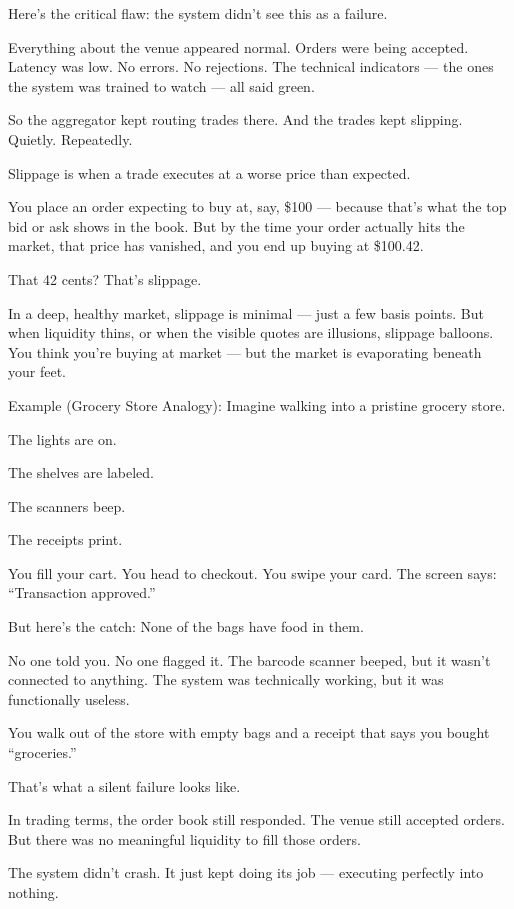 Here’s the critical flaw: the system didn’t see this as a failure.

Everything about the venue appeared normal. Orders were being accepted. Latency was low. No errors. 
No rejections. The technical indicators — the ones the system was trained to watch — all said green.

So the aggregator kept routing trades there. And the trades kept slipping. Quietly. Repeatedly.

Slippage is when a trade executes at a worse price than expected.

You place an order expecting to buy at, say, \$100 — because that’s what the top bid or ask shows 
in the book. But by the time your order actually hits the market, that price has vanished, and you 
end up buying at \$100.42.

That 42 cents?
That’s slippage.

In a deep, healthy market, slippage is minimal — just a few basis points. But when liquidity thins, 
or when the visible quotes are illusions, slippage balloons. You think you're buying at market — but 
the market is evaporating beneath your feet.

Example (Grocery Store Analogy):
Imagine walking into a pristine grocery store.

The lights are on.

The shelves are labeled.

The scanners beep.

The receipts print.

You fill your cart. You head to checkout.
You swipe your card.
The screen says: “Transaction approved.”

But here’s the catch:
None of the bags have food in them.

No one told you. No one flagged it. The barcode scanner beeped, but it wasn’t connected to anything. 
The system was technically working, but it was functionally useless.

You walk out of the store with empty bags and a receipt that says you bought “groceries.”

That’s what a silent failure looks like.

In trading terms, the order book still responded. The venue still accepted orders. But there was 
no meaningful liquidity to fill those orders.

The system didn’t crash.
It just kept doing its job — executing perfectly into nothing.

